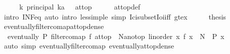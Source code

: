 \begin{isabellebody}
\ \ \isamarkupfalse%
\ \isamarkupfalse%
\ {\isachardoublequoteopen}{\isacharparenleft}{\kern0pt}{\isasymSqinter}k{\isachardot}{\kern0pt}\ principal\ {\isacharbraceleft}{\kern0pt}k{\isacharcolon}{\kern0pt}{\isacharcolon}{\kern0pt}{\isacharprime}{\kern0pt}a\ {\isacharless}{\kern0pt}{\isachardot}{\kern0pt}{\isachardot}{\kern0pt}{\isacharbraceright}{\kern0pt}{\isacharparenright}{\kern0pt}\ {\isacharequal}{\kern0pt}\ at{\isacharunderscore}{\kern0pt}top{\isachardoublequoteclose}\isanewline
\ \ \ \ \isamarkupfalse%
\ at{\isacharunderscore}{\kern0pt}top{\isacharunderscore}{\kern0pt}def\isanewline
\ \ \ \ \isamarkupfalse%
\ {\isacharparenleft}{\kern0pt}intro\ INF{\isacharunderscore}{\kern0pt}eq{\isacharparenright}{\kern0pt}\ {\isacharparenleft}{\kern0pt}auto\ intro{\isacharcolon}{\kern0pt}\ less{\isacharunderscore}{\kern0pt}imp{\isacharunderscore}{\kern0pt}le\ simp{\isacharcolon}{\kern0pt}\ Ici{\isacharunderscore}{\kern0pt}subset{\isacharunderscore}{\kern0pt}Ioi{\isacharunderscore}{\kern0pt}iff\ gt{\isacharunderscore}{\kern0pt}ex{\isacharparenright}{\kern0pt}\isanewline
\ \ \isamarkupfalse%
\ \isamarkupfalse%
\ {\isacharquery}{\kern0pt}thesis\ \isacommand{{\isachardot}{\kern0pt}}\isamarkupfalse%
\isanewline
{}\isamarkupfalse%
%
\endisatagproof
{\isafoldproof}%
%
\isadelimproof
\isanewline
%
\endisadelimproof
\ \ \isanewline
{}\isamarkupfalse%
\ eventually{\isacharunderscore}{\kern0pt}filtercomap{\isacharunderscore}{\kern0pt}at{\isacharunderscore}{\kern0pt}top{\isacharunderscore}{\kern0pt}dense{\isacharcolon}{\kern0pt}\ \isanewline
\ \ {\isachardoublequoteopen}eventually\ P\ {\isacharparenleft}{\kern0pt}filtercomap\ f\ at{\isacharunderscore}{\kern0pt}top{\isacharparenright}{\kern0pt}\ {\isasymlongleftrightarrow}\ {\isacharparenleft}{\kern0pt}{\isasymexists}N{\isacharcolon}{\kern0pt}{\isacharcolon}{\kern0pt}{\isacharprime}{\kern0pt}a{\isacharcolon}{\kern0pt}{\isacharcolon}{\kern0pt}{\isacharbraceleft}{\kern0pt}no{\isacharunderscore}{\kern0pt}top{\isacharcomma}{\kern0pt}\ linorder{\isacharbraceright}{\kern0pt}{\isachardot}{\kern0pt}\ {\isasymforall}x{\isachardot}{\kern0pt}\ f\ x\ {\isachargreater}{\kern0pt}\ N\ {\isasymlongrightarrow}\ P\ x{\isacharparenright}{\kern0pt}{\isachardoublequoteclose}\isanewline
%
\isadelimproof
\ \ %
\endisadelimproof
%
\isatagproof
{}\isamarkupfalse%
\ {\isacharparenleft}{\kern0pt}auto\ simp{\isacharcolon}{\kern0pt}\ eventually{\isacharunderscore}{\kern0pt}filtercomap\ eventually{\isacharunderscore}{\kern0pt}at{\isacharunderscore}{\kern0pt}top{\isacharunderscore}{\kern0pt}dense{\isacharparenright}{\kern0pt}%

\end{isabellebody}
